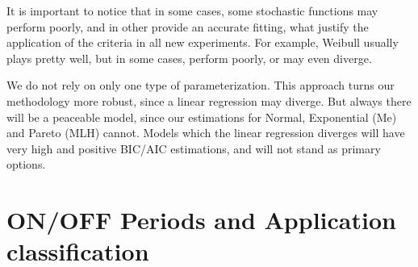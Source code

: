 It is important to notice that in some cases, some stochastic functions may perform poorly, and in other provide an accurate fitting, what justify the application of the criteria in all new experiments. For example, Weibull usually plays pretty well, but in some cases, perform poorly, or may even diverge. 

We do not rely on only one type of parameterization. This approach turns our methodology more robust, since a linear regression may diverge. But always there will be a peaceable model, since our estimations for Normal, Exponential (Me) and Pareto (MLH) cannot. Models which the linear regression diverges will have very high and positive BIC/AIC estimations, and will not stand as primary options.


\section{ON/OFF Periods and Application classification}

